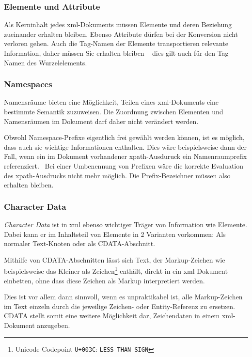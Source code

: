 
\subsubsection{Elemente und Attribute}

Als Kerninhalt jedes \acrshort{xml}-Dokuments müssen Elemente und deren Beziehung zueinander erhalten bleiben. Ebenso Attribute dürfen bei der Konversion nicht verloren gehen. Auch die Tag-Namen der Elemente transportieren relevante Information, daher müssen Sie erhalten bleiben -- dies gilt auch für den Tag-Namen des Wurzelelements.

\subsubsection{Namespaces}

Namensräume bieten eine Möglichkeit, Teilen eines \acrshort{xml}-Dokuments eine bestimmte Semantik zuzuweisen. Die Zuordnung zwischen Elementen und Namensräumen im Dokument darf daher nicht verändert werden.

Obwohl Namespace-Prefixe eigentlich frei gewählt werden können, ist es möglich, dass auch sie wichtige Informationen enthalten. Dies wäre beispielsweise dann der Fall, wenn ein im Dokument vorhandener \acrshort{xpath}-Ausduruck ein Namenraumprefix referenziert.~\cite[Abschn. 4.4]{boyer2001c14n} Bei einer Umbenennung von Prefixen wäre die korrekte Evaluation des \acrshort{xpath}-Ausdrucks nicht mehr möglich. Die Prefix-Bezeichner müssen also erhalten bleiben.

\subsubsection{Character Data}
\label{sec:cdata}

\emph{Character Data} ist in \acrshort{xml} ebenso wichtiger Träger von Information wie Elemente. Dabei kann er im Inhaltsteil von Elemente in 2 Varianten vorkommen: Als normaler Text-Knoten oder als CDATA-Abschnitt.

Mithilfe von CDATA-Abschnitten lässt sich Text, der Markup-Zeichen wie beispielsweise das Kleiner-als-Zeichen\footnote{Unicode-Codepoint \texttt{U+003C}: \texttt{LESS-THAN SIGN}} enthält, direkt in ein \acrshort{xml}-Dokument einbetten, ohne dass diese Zeichen als Markup interpretiert werden.

Dies ist vor allem dann sinnvoll, wenn es unpraktikabel ist, alle Markup-Zeichen im Text einzeln durch die jeweilige Zeichen- oder Entity-Referenz zu ersetzen. CDATA stellt somit eine weitere Möglichkeit dar, Zeichendaten in einem \acrshort{xml}-Dokument anzugeben.~\cite[Abschnitt~2.4]{maler2008xml}

